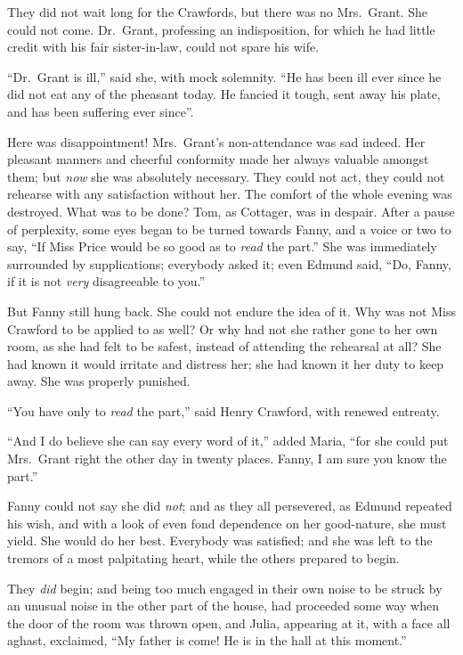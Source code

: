 They did not wait long for the Crawfords, but there
was no Mrs.\ Grant.  She could not come.  Dr.\ Grant,
professing an indisposition, for which he had little credit
with his fair sister-in-law, could not spare his wife.

``Dr.\ Grant is ill,'' said she, with mock solemnity.
``He has been ill ever since he did not eat any of the
pheasant today.  He fancied it tough, sent away his plate,
and has been suffering ever since''.

Here was disappointment!  Mrs.\ Grant's non-attendance
was sad indeed.  Her pleasant manners and cheerful
conformity made her always valuable amongst them;
but \emph{now} she was absolutely necessary.  They could not act,
they could not rehearse with any satisfaction without her.
The comfort of the whole evening was destroyed.
What was to be done?  Tom, as Cottager, was in despair.
After a pause of perplexity, some eyes began to be
turned towards Fanny, and a voice or two to say,
``If Miss Price would be so good as to \emph{read} the part.''
She was immediately surrounded by supplications;
everybody asked it; even Edmund said, ``Do, Fanny, if it is
not \emph{very} disagreeable to you.''

But Fanny still hung back.  She could not endure the idea
of it.  Why was not Miss Crawford to be applied to as well?
Or why had not she rather gone to her own room,
as she had felt to be safest, instead of attending
the rehearsal at all?  She had known it would irritate
and distress her; she had known it her duty to keep away.
She was properly punished.

``You have only to \emph{read} the part,'' said Henry Crawford,
with renewed entreaty.

``And I do believe she can say every word of it,''
added Maria, ``for she could put Mrs.\ Grant right the other
day in twenty places.  Fanny, I am sure you know the part.''

Fanny could not say she did \emph{not}; and as they all persevered,
as Edmund repeated his wish, and with a look of even
fond dependence on her good-nature, she must yield.
She would do her best.  Everybody was satisfied; and she
was left to the tremors of a most palpitating heart,
while the others prepared to begin.

They \emph{did} begin; and being too much engaged in their
own noise to be struck by an unusual noise in the other
part of the house, had proceeded some way when the door
of the room was thrown open, and Julia, appearing at it,
with a face all aghast, exclaimed, ``My father is come!
He is in the hall at this moment.''



